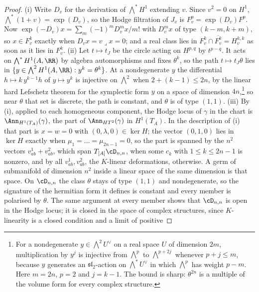 \begin{proof}
(i) Write $D_{v}$ for the derivation of $\bigwedge^{*}H^{1}$ extending $v$.
Since $v^{2}=0$ on $H^{1}$, $\bigwedge^{*}(1+v)=\exp(D_{v})$, so the Hodge
filtration of $J_{v}$ is $F^{p}_{v}=\exp(D_{v})F^{p}$. Now
$\exp(-D_{v})x=\sum_{m}(-1)^{m}D_{v}^{m}x/m!$ with $D_{v}^{m}x$ of type
$(k-m,k+m)$, so $x\in F^{k}_{v}$ exactly when $D_{v}x=v\lrcorner x=0$; and a
real class lies in $F^{k}_{v}\cap\overline{F^{k}_{v}}=H^{k,k}_{v}$ as soon as
it lies in $F^{k}_{v}$. (ii) Let $t\mapsto t_{J}$ be the circle acting on
$H^{p,q}$ by $t^{p-q}$. It acts on $\bigwedge^{*}H^{1}(A,\RR)$ by algebra
automorphisms and fixes $\theta^{k}$, so the path $t\mapsto t_{J}\theta$ lies in
$\{y\in\bigwedge^{2}H^{1}(A,\RR):y^{k}=\theta^{k}\}$. At a nondegenerate $y$
the differential $h\mapsto k\,y^{k-1}h$ of $y\mapsto y^{k}$ is injective on
$\bigwedge^{2}$ when $2+(k-1)\le2n$, by the linear hard Lefschetz theorem for
the symplectic form $y$ on a space of dimension $4n$,\footnote{For a
nondegenerate $y\in\bigwedge^{2}U^{\vee}$ on a real space $U$ of dimension
$2m$, multiplication by $y^{j}$ is injective from $\bigwedge^{p}$ to
$\bigwedge^{p+2j}$ whenever $p+j\le m$, because $y$ generates an
$\mathfrak{sl}_{2}$-action on $\bigwedge^{*}U^{\vee}$ in which $\bigwedge^{p}$
has weight $p-m$. Here $m=2n$, $p=2$ and $j=k-1$. The bound is sharp:
$\theta^{2n}$ is a multiple of the volume form for every complex structure.} so near $\theta$ that set
is discrete, the path is constant, and $\theta$ is of type $(1,1)$. (iii) By
(i), applied to each homogeneous component, the Hodge locus of $\gamma$ in the
chart is $\Ann_{H^{1}(T_{A})}(\gamma)$, the part of $\Ann_{HT^{2}}(\gamma)$ in
$H^{1}(T_{A})$. In the description of (i) that part is
$x=w=0$ with $(0,\lambda,0)\in\ker H$; the vector $(0,1,0)$ lies in $\ker H$
exactly when $\mu_{1}=\dots=\mu_{2n-1}=0$, so the part is spanned by the $n^{2}$
vectors $v^{1}_{ab}+v^{2}_{ab}$, which span $T_{[A]}\cD_{n,n}$, when some
$c_{k}$ with $1\le k\le2n-1$ is nonzero, and by all $v^{1}_{ab},v^{2}_{ab}$,
the $K$-linear deformations, otherwise. A germ of submanifold of dimension
$n^{2}$ inside a linear space of the same dimension is that space. On
$\cD_{n,n}$ the class $\theta$ stays of type $(1,1)$ and nondegenerate, so the
signature of the hermitian form it defines is constant and every member is
polarised by $\theta$. The same argument at every member shows that
$\cD_{n,n}$ is open in the Hodge locus; it is closed in the space of complex
structures, since $K$-linearity is a closed condition and a limit of positive

\end{proof}
